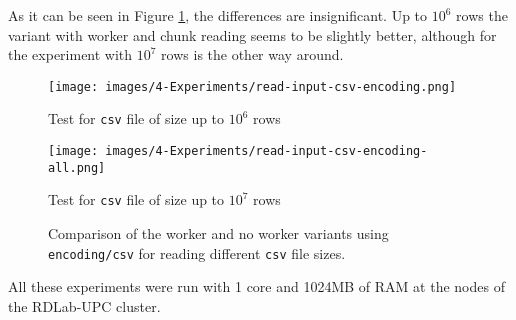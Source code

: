 As it can be seen in Figure \ref{img:exps-csv-encoding-variants}, the differences are insignificant. Up to $10^6$ rows the variant with worker and chunk reading seems to be slightly better, although for the experiment with $10^7$ rows is the other way around.

\begin{figure}[H]
  \centering
  \begin{minipage}{0.49\textwidth}
    \centering
    \texttt{[image: images/4-Experiments/read-input-csv-encoding.png]}
    \caption*{Test for \texttt{csv} file of size up to $10^6$ rows}
  \end{minipage}
  \hfill
  \begin{minipage}{0.49\textwidth}
    \centering
    \texttt{[image: images/4-Experiments/read-input-csv-encoding-all.png]}
    \caption*{Test for \texttt{csv} file of size up to $10^7$ rows}
  \end{minipage}
    \caption{Comparison of the worker and no worker variants using \texttt{encoding/csv} for reading different \texttt{csv} file sizes.}
    \label{img:exps-csv-encoding-variants}
\end{figure}

All these experiments were run with 1 core and 1024MB of RAM at the nodes of the RDLab-UPC cluster.
